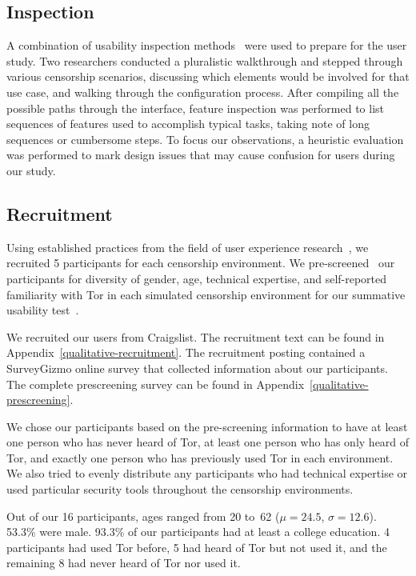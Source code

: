 \documentclass[USenglish,oneside,twocolumn]{article}
\begin{document}
\subsection{Inspection}
A combination of usability inspection methods~\cite{nielsen1994usability}
were used to prepare for the user study. Two researchers conducted a pluralistic 
walkthrough and stepped through various censorship
scenarios, discussing which elements would be involved for that use case, and walking 
through the configuration process. After compiling all the possible paths through the 
interface, feature inspection was performed to list sequences
of features used to accomplish typical tasks, taking note of long sequences or cumbersome
steps. To focus our observations, a heuristic evaluation was performed to mark design issues 
that may cause confusion for users during our study. 

\subsection{Recruitment}
Using established practices from the field of user experience research~\cite{howmanyusers},
we recruited 5 participants for each censorship environment.
We pre-screened~\cite{screening} our participants for diversity of gender, age, technical expertise,
and self-reported familiarity with Tor in each simulated censorship environment for our summative
usability test~\cite{summative}. 

We recruited our users from Craigslist. The recruitment text can be found in 
Appendix~\ref{qualitative-recruitment}. The recruitment posting contained a 
SurveyGizmo online survey that collected information about our participants.
The complete prescreening survey can be found in Appendix~\ref{qualitative-prescreening}.  

We chose our participants based on the pre-screening information to have 
at least one person who has never heard of Tor, at least one person who has 
only heard of Tor, and exactly one person who has previously used Tor in each
environment. We also tried to evenly distribute any participants who had technical
expertise or used particular security tools throughout the censorship environments. 

Out of our 16 participants, ages ranged from 20 to~62
($\mu = 24.5$, $\sigma = 12.6$). 53.3\% were male. 
93.3\% of our participants had at least
a college education.
4 participants had used Tor before,
5 had heard of Tor but not used it,
and the remaining 8 had never heard of Tor nor used it.
\end{document}
